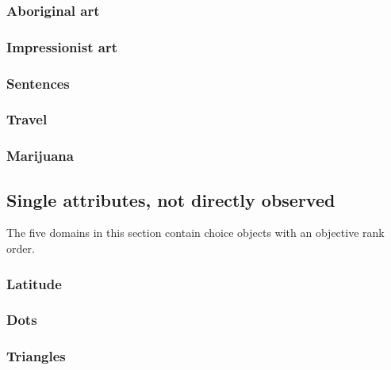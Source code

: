 \documentclass[11pt,letter]{article}
\begin{document}
\subsubsection{Aboriginal art}



\subsubsection{Impressionist art}



\subsubsection{Sentences}



\subsubsection{Travel}



\subsubsection{Marijuana}



\subsection{Single attributes, not directly observed}

The five domains in this section contain choice objects with an objective rank order.

\subsubsection{Latitude}



\subsubsection{Dots}



\subsubsection{Triangles}
\end{document}
